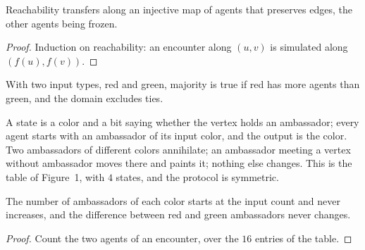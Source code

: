 \begin{lemma}\label{lem:graph-extend}
\leanok{}
Reachability transfers along an injective map of agents that preserves edges, the other agents
being frozen.
\end{lemma}
\begin{proof}\leanok
Induction on reachability: an encounter along $(u, v)$ is simulated along $(f(u), f(v))$.
\end{proof}

\begin{definition}[Majority]\label{def:majority}
\leanok{}
With two input types, red and green, majority is true if red has more agents than green, and the
domain excludes ties.
\end{definition}

\begin{definition}\label{def:ambassador}
\leanok{}
A state is a color and a bit saying whether the vertex holds an ambassador; every agent starts
with an ambassador of its input color, and the output is the color. Two ambassadors of different
colors annihilate; an ambassador meeting a vertex without ambassador moves there and paints it;
nothing else changes. This is the table of Figure~1, with $4$ states, and the protocol is
symmetric.
\end{definition}

\begin{lemma}[Invariants]\label{lem:amb-invariant}
\leanok{}
The number of ambassadors of each color starts at the input count and never increases, and the
difference between red and green ambassadors never changes.
\end{lemma}
\begin{proof}\leanok
Count the two agents of an encounter, over the $16$ entries of the table.
\end{proof}

